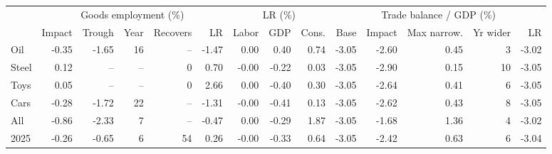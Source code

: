 \begin{tabular}{lrrrrrrrrrrrrr}
\toprule
 & \multicolumn{5}{c}{Goods employment (\%)} & \multicolumn{3}{c}{LR (\%)} & \multicolumn{5}{c}{Trade balance / GDP (\%)} \\
\cmidrule(lr){2-6}\cmidrule(lr){7-9}\cmidrule(lr){10-14}
 & Impact & Trough & Year & Recovers & LR & Labor & GDP & Cons. & Base & Impact & Max narrow. & Yr wider & LR \\
\midrule
Oil & -0.35 & -1.65 & 16 & -- & -1.47 & 0.00 & 0.40 & 0.74 & -3.05 & -2.60 & 0.45 & 3 & -3.02 \\
Steel & 0.12 & -- & -- & 0 & 0.70 & -0.00 & -0.22 & 0.03 & -3.05 & -2.90 & 0.15 & 10 & -3.05 \\
Toys & 0.05 & -- & -- & 0 & 2.66 & 0.00 & -0.40 & 0.30 & -3.05 & -2.64 & 0.41 & 6 & -3.05 \\
Cars & -0.28 & -1.72 & 22 & -- & -1.31 & -0.00 & -0.41 & 0.13 & -3.05 & -2.62 & 0.43 & 8 & -3.05 \\
All & -0.86 & -2.33 & 7 & -- & -0.47 & 0.00 & -0.29 & 1.87 & -3.05 & -1.68 & 1.36 & 4 & -3.02 \\
2025 & -0.26 & -0.65 & 6 & 54 & 0.26 & -0.00 & -0.33 & 0.64 & -3.05 & -2.42 & 0.63 & 6 & -3.04 \\
\bottomrule
\end{tabular}

